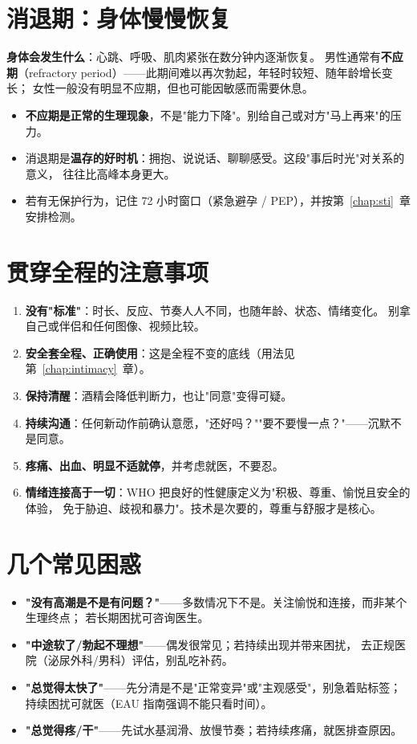 \documentclass[12pt,UTF8,openany]{ctexbook}
\begin{document}
\section{消退期：身体慢慢恢复}

\textbf{身体会发生什么}：心跳、呼吸、肌肉紧张在数分钟内逐渐恢复。
男性通常有\textbf{不应期}（refractory period）——此期间难以再次勃起，年轻时较短、随年龄增长变长；
女性一般没有明显不应期，但也可能因敏感而需要休息。

\begin{itemize}[leftmargin=2em]
  \item \textbf{不应期是正常的生理现象}，不是"能力下降"。别给自己或对方"马上再来"的压力。
  \item 消退期是\textbf{温存的好时机}：拥抱、说说话、聊聊感受。这段"事后时光"对关系的意义，
        往往比高峰本身更大。
  \item 若有无保护行为，记住 72 小时窗口（紧急避孕 / PEP），并按第~\ref{chap:sti}~章安排检测。
\end{itemize}

\section{贯穿全程的注意事项}

\begin{enumerate}[leftmargin=2em,itemsep=0.3em]
  \item \textbf{没有"标准"}：时长、反应、节奏人人不同，也随年龄、状态、情绪变化。
        别拿自己或伴侣和任何图像、视频比较。
  \item \textbf{安全套全程、正确使用}：这是全程不变的底线（用法见第~\ref{chap:intimacy}~章）。
  \item \textbf{保持清醒}：酒精会降低判断力，也让"同意"变得可疑。
  \item \textbf{持续沟通}：任何新动作前确认意愿，"还好吗？""要不要慢一点？"——沉默不是同意。
  \item \textbf{疼痛、出血、明显不适就停}，并考虑就医，不要忍。
  \item \textbf{情绪连接高于一切}：WHO 把良好的性健康定义为"积极、尊重、愉悦且安全的体验，
        免于胁迫、歧视和暴力"。技术是次要的，尊重与舒服才是核心。
\end{enumerate}

\section{几个常见困惑}

\begin{itemize}[leftmargin=2em]
  \item \textbf{"没有高潮是不是有问题？"}——多数情况下不是。关注愉悦和连接，而非某个生理终点；
        若长期困扰可咨询医生。
  \item \textbf{"中途软了/勃起不理想"}——偶发很常见；若持续出现并带来困扰，
        去正规医院（泌尿外科/男科）评估，别乱吃补药。
  \item \textbf{"总觉得太快了"}——先分清是不是"正常变异"或"主观感受"，别急着贴标签；
        持续困扰可就医（EAU 指南强调不能只看时间）。
  \item \textbf{"总觉得疼/干"}——先试水基润滑、放慢节奏；若持续疼痛，就医排查原因。
\end{itemize}
\end{document}
